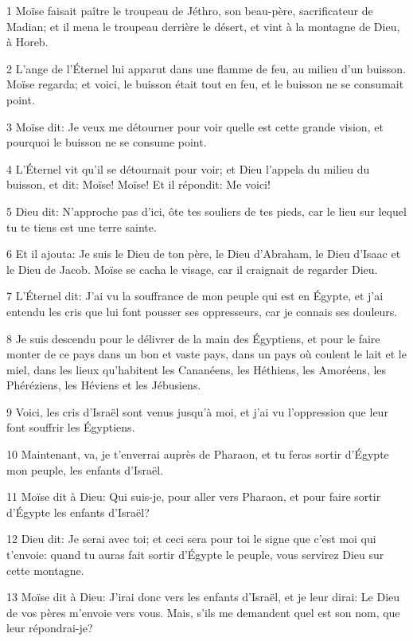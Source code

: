 \par 1 Moïse faisait paître le troupeau de Jéthro, son beau-père, sacrificateur de Madian; et il mena le troupeau derrière le désert, et vint à la montagne de Dieu, à Horeb.
\par 2 L'ange de l'Éternel lui apparut dans une flamme de feu, au milieu d'un buisson. Moïse regarda; et voici, le buisson était tout en feu, et le buisson ne se consumait point.
\par 3 Moïse dit: Je veux me détourner pour voir quelle est cette grande vision, et pourquoi le buisson ne se consume point.
\par 4 L'Éternel vit qu'il se détournait pour voir; et Dieu l'appela du milieu du buisson, et dit: Moïse! Moïse! Et il répondit: Me voici!
\par 5 Dieu dit: N'approche pas d'ici, ôte tes souliers de tes pieds, car le lieu sur lequel tu te tiens est une terre sainte.
\par 6 Et il ajouta: Je suis le Dieu de ton père, le Dieu d'Abraham, le Dieu d'Isaac et le Dieu de Jacob. Moïse se cacha le visage, car il craignait de regarder Dieu.
\par 7 L'Éternel dit: J'ai vu la souffrance de mon peuple qui est en Égypte, et j'ai entendu les cris que lui font pousser ses oppresseurs, car je connais ses douleurs.
\par 8 Je suis descendu pour le délivrer de la main des Égyptiens, et pour le faire monter de ce pays dans un bon et vaste pays, dans un pays où coulent le lait et le miel, dans les lieux qu'habitent les Cananéens, les Héthiens, les Amoréens, les Phéréziens, les Héviens et les Jébusiens.
\par 9 Voici, les cris d'Israël sont venus jusqu'à moi, et j'ai vu l'oppression que leur font souffrir les Égyptiens.
\par 10 Maintenant, va, je t'enverrai auprès de Pharaon, et tu feras sortir d'Égypte mon peuple, les enfants d'Israël.
\par 11 Moïse dit à Dieu: Qui suis-je, pour aller vers Pharaon, et pour faire sortir d'Égypte les enfants d'Israël?
\par 12 Dieu dit: Je serai avec toi; et ceci sera pour toi le signe que c'est moi qui t'envoie: quand tu auras fait sortir d'Égypte le peuple, vous servirez Dieu sur cette montagne.
\par 13 Moïse dit à Dieu: J'irai donc vers les enfants d'Israël, et je leur dirai: Le Dieu de vos pères m'envoie vers vous. Mais, s'ils me demandent quel est son nom, que leur répondrai-je?

